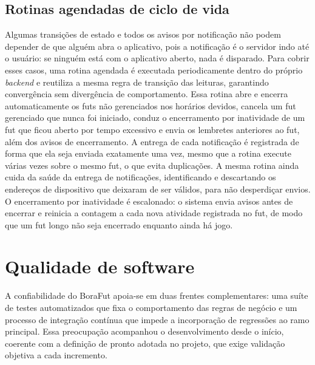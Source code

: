     \subsection{Rotinas agendadas de ciclo de vida}
      \label{subsec:dev-cron}
      Algumas transições de estado e todos os avisos por notificação não podem depender de que alguém abra o aplicativo, pois a notificação é o servidor indo até o usuário: se ninguém está com o aplicativo aberto, nada é disparado. Para cobrir esses casos, uma rotina agendada é executada periodicamente dentro do próprio \textit{backend} e reutiliza a mesma regra de transição das leituras, garantindo convergência sem divergência de comportamento. Essa rotina abre e encerra automaticamente os futs não gerenciados nos horários devidos, cancela um fut gerenciado que nunca foi iniciado, conduz o encerramento por inatividade de um fut que ficou aberto por tempo excessivo e envia os lembretes anteriores ao fut, além dos avisos de encerramento. A entrega de cada notificação é registrada de forma que ela seja enviada exatamente uma vez, mesmo que a rotina execute várias vezes sobre o mesmo fut, o que evita duplicações. A mesma rotina ainda cuida da saúde da entrega de notificações, identificando e descartando os endereços de dispositivo que deixaram de ser válidos, para não desperdiçar envios.
 O encerramento por inatividade é escalonado: o sistema envia avisos antes de encerrar e reinicia a contagem a cada nova atividade registrada no fut, de modo que um fut longo não seja encerrado enquanto ainda há jogo.

\section{Qualidade de software}
  \label{sec:dev-qualidade}

    A confiabilidade do BoraFut apoia-se em duas frentes complementares: uma suíte de testes automatizados que fixa o comportamento das regras de negócio e um processo de integração contínua que impede a incorporação de regressões ao ramo principal. Essa preocupação acompanhou o desenvolvimento desde o início, coerente com a definição de pronto adotada no projeto, que exige validação objetiva a cada incremento.

